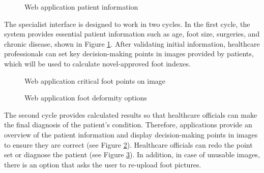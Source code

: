 \begin{figure}[htbp]
\centering
{}
\caption{Web application patient information}
\label{fig:WebApplicationPatientInfo}
\end{figure}

The specialist interface is designed to work in two cycles. In the first cycle, the system provides essential patient information such as age, foot size, surgeries, and chronic disease, shown in Figure \ref{fig:WebApplicationPatientInfo}. After validating initial information, healthcare professionals can set key decision-making points in images provided by patients, which will be used to calculate novel-approved foot indexes. 

\begin{figure}[htbp]
\centering
{}
\caption{Web application critical foot points on image}
\label{fig:WebApplicationFootPoints}
\end{figure}

\begin{figure}[htbp]
\centering
{}
\caption{Web application foot deformity options}
\label{fig:WebApplicationSetFootDeformity}
\end{figure}

The second cycle provides calculated results so that healthcare officials can make the final diagnosis of the patient's condition. Therefore, applications provide an overview of the patient information and display decision-making points in images to ensure they are correct (see Figure \ref{fig:WebApplicationFootPoints}). Healthcare officials can redo the point set or diagnose the patient (see Figure \ref{fig:WebApplicationSetFootDeformity}). In addition, in case of unusable images, there is an option that asks the user to re-upload foot pictures.

